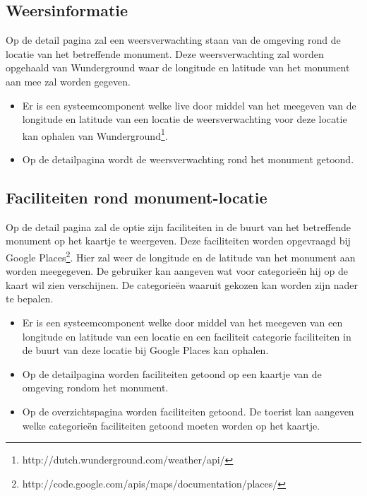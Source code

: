 \documentclass[a4paper,10pt]{article}
\begin{document}
            \subsection{Weersinformatie}
            Op de detail pagina zal een weersverwachting staan van de omgeving rond de locatie van het betreffende monument. Deze weersverwachting zal worden opgehaald van Wunderground waar de longitude en latitude van het monument aan mee zal worden gegeven.
            \begin{itemize}
            \item Er is een systeemcomponent welke live door middel van het meegeven van de longitude en latitude van een locatie de weersverwachting voor deze locatie kan ophalen van Wunderground\footnote{http://dutch.wunderground.com/weather/api/}.
            \item Op de detailpagina wordt de weersverwachting rond het monument getoond.
            \end{itemize}
                
            \subsection{Faciliteiten rond monument-locatie}
            Op de detail pagina zal de optie zijn faciliteiten in de buurt van het betreffende monument op het kaartje te weergeven. Deze faciliteiten worden opgevraagd bij Google Places\footnote{http://code.google.com/apis/maps/documentation/places/}. Hier zal weer de longitude en de latitude van het monument aan worden meegegeven. De gebruiker kan aangeven wat voor categorie\"en hij op de kaart wil zien verschijnen. De categorie\"en waaruit gekozen kan worden zijn nader te bepalen.
            \begin{itemize}
            \item Er is een systeemcomponent welke door middel van het meegeven van een longitude en latitude van een locatie en een faciliteit categorie faciliteiten in de buurt van deze locatie bij Google Places kan ophalen.
            \item Op de detailpagina worden faciliteiten getoond op een kaartje van de omgeving rondom het monument.
	  \item  Op de overzichtspagina worden faciliteiten getoond. De toerist kan aangeven welke categorie\"en faciliteiten getoond moeten worden op het kaartje.
            \end{itemize}
                
\end{document}
